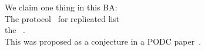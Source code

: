 
\begin{frame}{}
  \begin{center}
    {\large We claim one thing in this BA:} \\[10pt]

    {\Large The  protocol~ for replicated list \\
     the ~.}  \\[25pt]

    \pause
    {\large This was proposed as a conjecture in a PODC paper~.}
  \end{center}
\end{frame}

